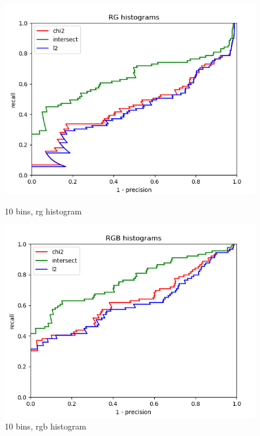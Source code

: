\documentclass{article}
\begin{document}
\begin{figure}[ht]
    \centering
    \begin{minipage}{.5\textwidth}
        \includegraphics[width=\linewidth]{images/Q4.b-rg_histogram_10_bins.png}
        \caption{10 bins, rg histogram}
    \end{minipage}\hfill
    \begin{minipage}{.5\textwidth}
        \includegraphics[width=\linewidth]{images/Q4.b-rgb_histogram_10_bins.png}
        \caption{10 bins, rgb histogram}
    \end{minipage}
    \begin{minipage}{.5\textwidth}

\end{minipage}
\end{figure}
\end{document}

